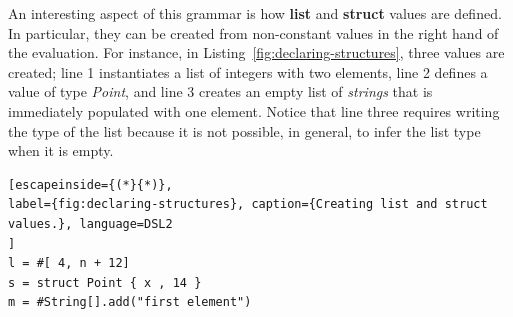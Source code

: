 An interesting aspect of this grammar is how \textbf{list} and \textbf{struct} values are defined.
In particular, they can be created from non-constant values in the right hand of the evaluation.
For instance, in Listing~\ref{fig:declaring-structures}, three values are created; line 1 instantiates a list of integers with two elements, line 2 defines a value of type \textit{Point}, and line 3 creates an empty list of \textit{strings} that is immediately populated with one element.
Notice that line three requires writing the type of the list because it is not possible, in general, to infer the list type when it is empty. 

\begin{lstlisting}[escapeinside={(*}{*)}, 
label={fig:declaring-structures}, caption={Creating list and struct values.}, language=DSL2
]
l = #[ 4, n + 12]
s = struct Point { x , 14 }
m = #String[].add("first element")
\end{lstlisting}




